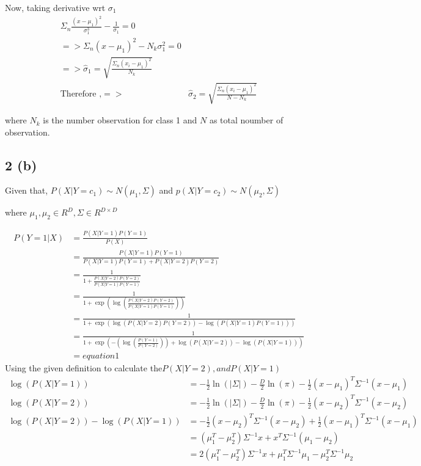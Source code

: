 \documentclass[10pt,letterpaper]{article}
\begin{document}
Now, taking derivative wrt $\sigma_1$
\begin{align*}
 \Sigma_n \frac{(x-\mu_1)^2}{\sigma_1^3} -\frac{1}{\sigma_1}  =0\\
=>  \Sigma_n (x-\mu_1)^2 - N_k\sigma_1^2=0\\
=>\hat\sigma_1 = \sqrt{\frac { \Sigma_n (x_i-\mu_1)^2}{N_k} }\\
\text{Therefore ,} =>& \hat \sigma_2= \sqrt{\frac {\Sigma_n (x_i-\mu_1)^2} {N-N_k} }
\end{align*}

where $N_k$ is the number observation for class 1 and   $N$ as total noumber of observation.

\subsection{2 (b)}
Given that,
$P(X|Y=c_1) \sim N(\mu_1, \Sigma)$ and $p(X|Y=c_2) \sim N(\mu_2, \Sigma)$
		
		where $\mu_1, \mu_2 \in R^D, \Sigma \in R^{D\times D}$
		
\begin{align*}
P(Y=1|X) &= \frac{P(X|Y=1)P(Y=1)}{P(X)}\\
		&= \frac{P(X|Y=1)P(Y=1)}{P(X|Y=1)P(Y=1)+P(X|Y=2)P(Y=2)}\\
		&= \frac{1}{1+\frac{P(X|Y=2)P(Y=2)}{P(X|Y=1)P(Y=1)}}\\
		&= \frac{1}{1+\exp(\log(\frac{P(X|Y=2)P(Y=2)}{P(X|Y=1)P(Y=1)}))}\\
		&= \frac{1}{1+\exp(\log({P(X|Y=2)P(Y=2)})-\log({P(X|Y=1)P(Y=1)}))}\\
		&= \frac{1}{1+\exp(-(\log(\frac{P(Y=1)}{P(Y=2)}))+\log(P(X|Y=2))-\log(P(X|Y=1)))}\\
		&=equation 1
\end{align*}
		Using the given definition to calculate the$ P(X|Y=2) ,and P(X|Y=1)$
\begin{align*}
\log(P(X|Y=1)) &= -\frac{1}{2} \ln(|\Sigma|) - \frac{D}{2}\ln(\pi) -\frac{1}{2}(x-\mu_1)^T\Sigma^{-1}(x-\mu_1)\\ 
\log(P(X|Y=2)) &= -\frac{1}{2} \ln(|\Sigma|) - \frac{D}{2}\ln(\pi) -\frac{1}{2}(x-\mu_2)^T\Sigma^{-1}(x-\mu_2)\\
\log(P(X|Y=2))-\log(P(X|Y=1)) &=- \frac{1}{2}(x-\mu_2)^T\Sigma^{-1}(x-\mu_2) + \frac{1}{2}(x-\mu_1)^T\Sigma^{-1}(x-\mu_1) \\
		 &= (\mu_1^T-\mu_2^T)\Sigma^{-1}x + x^T\Sigma^{-1}(\mu_1-\mu_2)\\
		 &= 2(\mu_1^T-\mu_2^T)\Sigma^{-1}x + \mu_1^T \Sigma^{-1} \mu_1 - \mu_2^T \Sigma^{-1} \mu_2
\end{align*}
		
\end{document}

